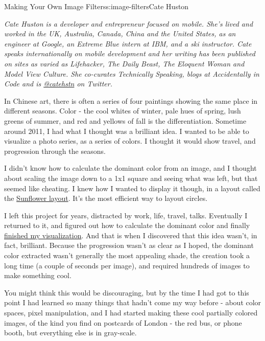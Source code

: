\begin{aosachapter}{Making Your Own Image Filters}{s:image-filters}{Cate Huston}

\emph{Cate Huston is a developer and entrepreneur focused on mobile.
She's lived and worked in the UK, Australia, Canada, China and the
United States, as an engineer at Google, an Extreme Blue intern at IBM,
and a ski instructor. Cate speaks internationally on mobile development
and her writing has been published on sites as varied as Lifehacker, The
Daily Beast, The Eloquent Woman and Model View Culture. She co-curates
Technically Speaking, blogs at Accidentally in Code and is
\href{https://twitter.com/catehstn}{@catehstn} on Twitter.}

\label{a-story-of-a-brilliant-idea-that-wasnt-all-that-brilliant}

In Chinese art, there is often a series of four paintings showing the
same place in different seasons. Color - the cool whites of winter, pale
hues of spring, lush greens of summer, and red and yellows of fall is
the differentiation. Sometime around 2011, I had what I thought was a
brilliant idea. I wanted to be able to visualize a photo series, as a
series of colors. I thought it would show travel, and progression
through the seasons.

I didn't know how to calculate the dominant color from an image, and I
thought about scaling the image down to a 1x1 square and seeing what was
left, but that seemed like cheating. I knew how I wanted to display it
though, in a layout called the
\href{http://www.catehuston.com/applets/Sunflower/index.html}{Sunflower
layout}. It's the most efficient way to layout circles.

I left this project for years, distracted by work, life, travel, talks.
Eventually I returned to it, and figured out how to calculate the
dominant color and finally
\href{http://www.catehuston.com/blog/2013/09/02/visualising-a-photo-series/}{finished
my visualization}. And that is when I discovered that this idea wasn't,
in fact, brilliant. Because the progression wasn't as clear as I hoped,
the dominant color extracted wasn't generally the most appealing shade,
the creation took a long time (a couple of seconds per image), and
required hundreds of images to make something cool.

You might think this would be discouraging, but by the time I had got to
this point I had learned so many things that hadn't come my way before -
about color spaces, pixel manipulation, and I had started making these
cool partially colored images, of the kind you find on postcards of
London - the red bus, or phone booth, but everything else is in
gray-scale.


\end{aosachapter}
